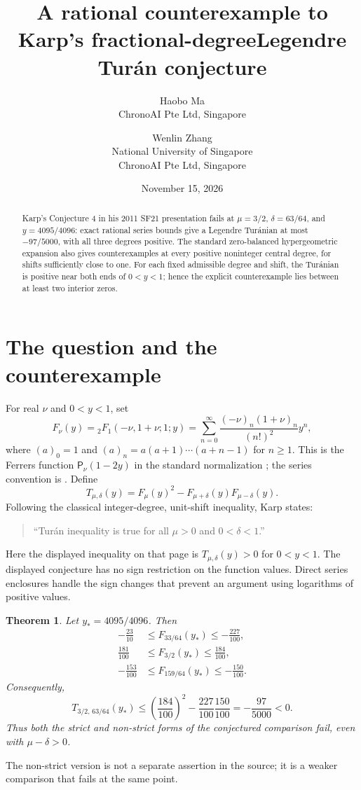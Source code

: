 \documentclass[11pt]{article}
\title{A rational counterexample to Karp's fractional-degree\newline Legendre Tur\'an conjecture}
\author{Haobo Ma\\\small ChronoAI Pte Ltd, Singapore
\and Wenlin Zhang\\\small National University of Singapore\\\small ChronoAI Pte Ltd, Singapore}
\date{November 15, 2026}
\newtheorem{theorem}{Theorem}
\newcommand{\F}{F}
\begin{document}
\maketitle
\begin{abstract}
Karp's Conjecture 4 in his 2011 SF21 presentation
\cite[physical PDF p.~52, repeated on pp.~53--54]{karp} fails at
$\mu=3/2$, $\delta=63/64$, and $y=4095/4096$:
exact rational series bounds give a Legendre Tur\'anian at most
$-97/5000$, with all three degrees positive.
The standard zero-balanced hypergeometric expansion also gives
counterexamples at every positive noninteger central degree, for shifts
sufficiently close to one. For each fixed admissible degree and shift,
the Tur\'anian is positive near both ends of $0<y<1$; hence the explicit
counterexample lies between at least two interior zeros.
\end{abstract}

\section{The question and the counterexample}
For real $\nu$ and $0<y<1$, set
\begin{equation}\label{defF}
 \F_\nu(y)={}_2F_1(-\nu,1+\nu;1;y)
 =\sum_{n=0}^{\infty}\frac{(-\nu)_n(1+\nu)_n}{(n!)^2}y^n,
\end{equation}
where $(a)_0=1$ and $(a)_n=a(a+1)\cdots(a+n-1)$ for $n\geq1$.
This is the Ferrers function $\mathsf P_\nu(1-2y)$ in the standard
normalization \cite[\S14.3(i)]{dlmflegendre}; the series convention is
\cite[\S15.2(i)]{dlmfhypergeometric}. Define
\[
 T_{\mu,\delta}(y)=\F_\mu(y)^2-
 \F_{\mu+\delta}(y)\F_{\mu-\delta}(y).
\]
Following the classical integer-degree, unit-shift inequality, Karp
\cite[p.~52, Conjecture~4]{karp} states:
\begin{quote}
``Tur\'an inequality is true for all $\mu>0$ and $0<\delta<1$.''
\end{quote}
Here the displayed inequality on that page is $T_{\mu,\delta}(y)>0$
for $0<y<1$.
The displayed conjecture has no sign restriction on the function values.
Direct series enclosures handle the sign changes that prevent an argument
using logarithms of positive values.

\begin{theorem}\label{thm:main}
Let $y_*=4095/4096$. Then
\begin{align*}
 -\frac{23}{10}&\leq \F_{33/64}(y_*)\leq-\frac{227}{100},\\
 \frac{181}{100}&\leq \F_{3/2}(y_*)\leq\frac{184}{100},\\
 -\frac{153}{100}&\leq \F_{159/64}(y_*)\leq-\frac{150}{100}.
\end{align*}
Consequently,
\begin{equation}\label{neg}
 T_{3/2,\,63/64}(y_*)\leq
 \left(\frac{184}{100}\right)^2-
 \frac{227}{100}\frac{150}{100}
 =-\frac{97}{5000}<0.
\end{equation}
Thus both the strict and non-strict forms of the conjectured comparison
fail, even with $\mu-\delta>0$.
\end{theorem}
The non-strict version is not a separate assertion in the source; it is
a weaker comparison that fails at the same point.
\end{document}
